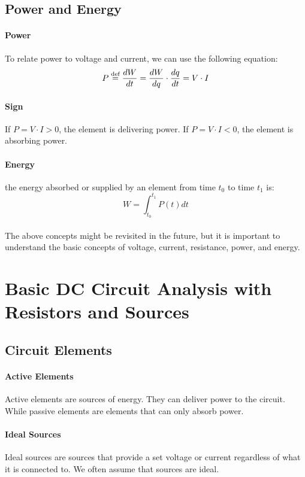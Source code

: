 \documentclass[11pt]{article}
\begin{document}
\subsection{Power and Energy}
\paragraph{Power} To relate power to  voltage and current, we can use the following equation:
\begin{equation}
    P \stackrel{\text{def}}{=} \frac{dW}{dt} = \frac{dW}{dq} \cdot \frac{dq}{dt} = V \cdot I
\end{equation}
\paragraph{Sign} If $P = V \cdot I > 0$, the element is delivering power. If $P = V \cdot I < 0$, the element is absorbing power.
\paragraph{Energy}  the energy absorbed or supplied by an element
from time $t_0$ to time $t_1$ is:
\begin{equation}
    W = \int_{t_0}^{t_1} P(t) dt
\end{equation}
\paragraph{} The above concepts might be revisited in the future, but it is important to understand the basic concepts of voltage, current, resistance, power, and energy.
\section{Basic DC Circuit Analysis with Resistors and Sources}
\subsection{Circuit Elements}
\paragraph{Active Elements} Active elements are sources of energy. They can deliver power to the circuit. While passive elements are elements that can only absorb power.
\paragraph{Ideal Sources} Ideal sources are sources that provide a set voltage or current regardless of what it is connected to. We often assume that sources are ideal.
\end{document}
